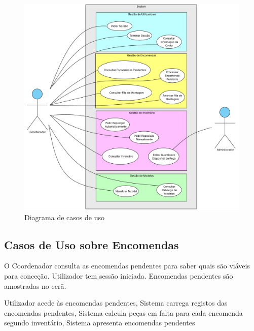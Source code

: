         \begin{figure}[h]
            \centering
            \includegraphics[width=1\textwidth]{images/cap3_diagcasos.pdf}
            \caption{Diagrama de casos de uso}
            \label{fig:diagcasos}
        \end{figure}
        
        \newpage
        \subsection{Casos de Uso sobre Encomendas}

                {O Coordenador consulta as encomendas pendentes para saber quais são viáveis para conceção.}
                {Utilizador tem sessão iniciada.}
                {Encomendas pendentes são amostradas no ecrã.}

            {
                Utilizador acede às encomendas pendentes,
                Sistema carrega registos das encomendas pendentes,
                Sistema calcula peças em falta para cada encomenda segundo inventário,
                Sistema apresenta encomendas pendentes
            }

